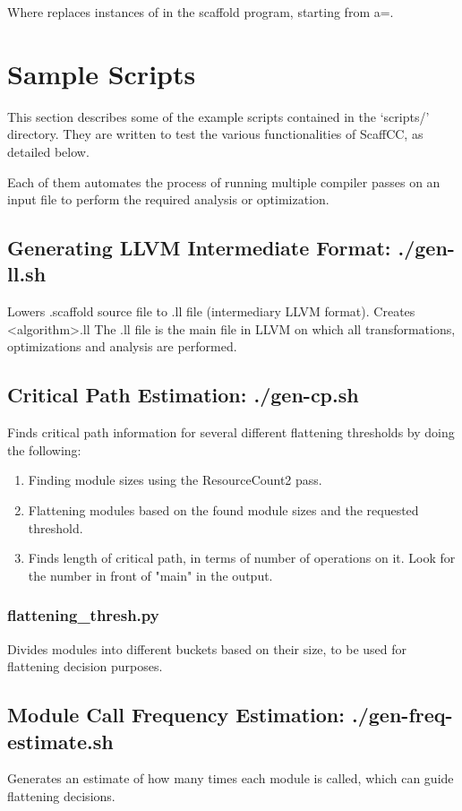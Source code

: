 Where  replaces instances of  in the scaffold program, starting from a=.

\section{Sample Scripts}
This section describes some of the example scripts contained in the `scripts/' directory. They are written to test the various functionalities 
of ScaffCC, as detailed below.

Each of them automates the process of running multiple compiler passes on an input file to perform the required analysis or optimization.


\subsection{Generating LLVM Intermediate Format: ./gen-ll.sh}

Lowers .scaffold source file to .ll file (intermediary LLVM format). Creates \textless algorithm\textgreater.ll
The .ll file is the main file in LLVM on which all transformations, optimizations and analysis are performed.


\subsection{Critical Path Estimation: ./gen-cp.sh}

Finds critical path information for several different flattening thresholds by doing the following:
\begin{enumerate}
\item Finding module sizes using the ResourceCount2 pass.
\item Flattening modules based on the found module sizes and the requested threshold.
\item Finds length of critical path, in terms of number of operations on it. Look for the number in front of "main" in the output. 
\end{enumerate}

\subsubsection{flattening\_thresh.py} 
Divides modules into different buckets based on their size, to be used for flattening decision purposes.


\subsection{Module Call Frequency Estimation: ./gen-freq-estimate.sh}
Generates an estimate of how many times each module is called, which can guide flattening decisions.


